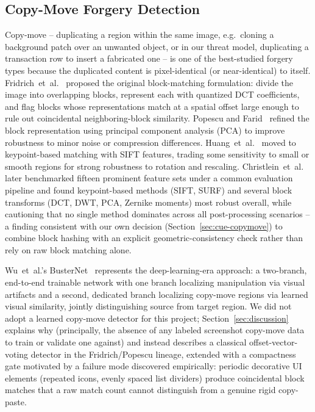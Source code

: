 \documentclass[conference]{IEEEtran}
\begin{document}
\subsection{Copy-Move Forgery Detection}
Copy-move -- duplicating a region within the same image, e.g.\ cloning a
background patch over an unwanted object, or in our threat model, duplicating
a transaction row to insert a fabricated one -- is one of the best-studied
forgery types because the duplicated content is pixel-identical (or
near-identical) to itself. Fridrich~et~al.~\cite{fridrich2003copymove}
proposed the original block-matching formulation: divide the image into
overlapping blocks, represent each with quantized DCT coefficients, and flag
blocks whose representations match at a spatial offset large enough to rule
out coincidental neighboring-block similarity. Popescu and
Farid~\cite{popescu2004exposing} refined the block representation using
principal component analysis (PCA) to improve robustness to minor noise or
compression differences. Huang~et~al.~\cite{huang2008sift} moved to
keypoint-based matching with SIFT features, trading some sensitivity to small
or smooth regions for strong robustness to rotation and rescaling.
Christlein~et~al.~\cite{christlein2012evaluation} later benchmarked fifteen
prominent feature sets under a common evaluation pipeline and found
keypoint-based methods (SIFT, SURF) and several block transforms (DCT, DWT,
PCA, Zernike moments) most robust overall, while cautioning that no single
method dominates across all post-processing scenarios -- a finding consistent
with our own decision (Section~\ref{sec:cue-copymove}) to combine block
hashing with an explicit geometric-consistency check rather than rely on raw
block matching alone.

Wu~et~al.'s BusterNet~\cite{wu2018busternet} represents the deep-learning-era
approach: a two-branch, end-to-end trainable network with one branch
localizing manipulation via visual artifacts and a second, dedicated branch
localizing copy-move regions via learned visual similarity, jointly
distinguishing source from target region. We did not adopt a learned
copy-move detector for this project; Section~\ref{sec:discussion} explains
why (principally, the absence of any labeled screenshot copy-move data to
train or validate one against) and instead describes a classical
offset-vector-voting detector in the Fridrich/Popescu lineage, extended with
a compactness gate motivated by a failure mode discovered empirically:
periodic decorative UI elements (repeated icons, evenly spaced list dividers)
produce coincidental block matches that a raw match count cannot distinguish
from a genuine rigid copy-paste.
\end{document}
